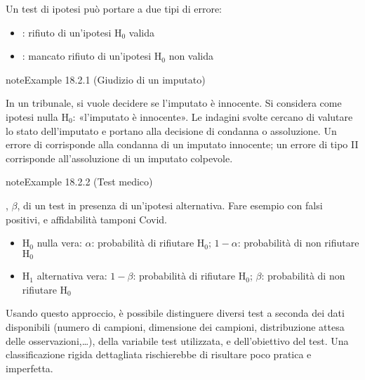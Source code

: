 \documentclass[letterpaper,10pt,italian]{jupyterBook}
\begin{document}
\sphinxAtStartPar
{} Un test di ipotesi può portare a due tipi di errore:
\begin{itemize}
\item {} 
\sphinxAtStartPar
{}: rifiuto di un’ipotesi \(\text{H}_0\) valida

\item {} 
\sphinxAtStartPar
{}: mancato rifiuto di un’ipotesi \(\text{H}_0\) non valida

\end{itemize}
\label{ch/statistics/hp-test:example-0}
\begin{sphinxadmonition}{note}{Example 18.2.1 (Giudizio di un imputato)}



\sphinxAtStartPar
In un tribunale, si vuole decidere se l’imputato è innocente. Si considera come ipotesi nulla \(\text{H}_0\): «l’imputato è innocente». Le indagini svolte cercano di valutare lo stato dell’imputato e portano alla decisione di condanna o assoluzione. Un errore di  corrisponde alla condanna di un imputato innocente; un errore di tipo II corrisponde all’assoluzione di un imputato colpevole.
\end{sphinxadmonition}
\label{ch/statistics/hp-test:example-1}
\begin{sphinxadmonition}{note}{Example 18.2.2 (Test medico)}



\sphinxAtStartPar
{} , \(\beta\), di un test in presenza di un’ipotesi alternativa. Fare esempio con falsi positivi, e affidabilità tamponi Covid.
\begin{itemize}
\item {} 
\sphinxAtStartPar
\(\text{H}_0\) nulla vera: \(\alpha\): probabilità di rifiutare \(\text{H}_0\); \(1-\alpha\): probabilità di non rifiutare \(\text{H}_0\)

\item {} 
\sphinxAtStartPar
\(\text{H}_1\) alternativa vera: \(1-\beta\): probabilità di rifiutare \(\text{H}_0\); \(\beta\): probabilità di non rifiutare \(\text{H}_0\)

\end{itemize}
\end{sphinxadmonition}

\sphinxAtStartPar
Usando questo approccio, è possibile distinguere diversi test a seconda dei dati disponibili (numero di campioni, dimensione dei campioni, distribuzione attesa delle osservazioni,…), della variabile test utilizzata, e dell’obiettivo del test. Una classificazione rigida dettagliata rischierebbe di risultare poco pratica e imperfetta.
\end{document}
